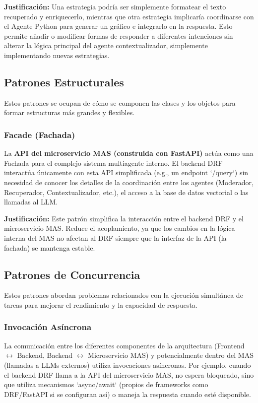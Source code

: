 \textbf{Justificación:} Una estrategia podría ser simplemente formatear el texto recuperado y enriquecerlo, mientras que otra estrategia implicaría coordinarse con el Agente Python para generar un gráfico e integrarlo en la respuesta. Esto permite añadir o modificar formas de responder a diferentes intenciones sin alterar la lógica principal del agente contextualizador, simplemente implementando nuevas estrategias.

\subsection{Patrones Estructurales}
\label{subsec:patrones_estructurales}
Estos patrones se ocupan de cómo se componen las clases y los objetos para formar estructuras más grandes y flexibles.

\subsubsection{Facade (Fachada)}
La \textbf{API del microservicio MAS (construida con FastAPI)} actúa como una Fachada para el complejo sistema multiagente interno. El backend DRF interactúa únicamente con esta API simplificada (e.g., un endpoint `/query`) sin necesidad de conocer los detalles de la coordinación entre los agentes (Moderador, Recuperador, Contextualizador, etc.), el acceso a la base de datos vectorial o las llamadas al LLM.

\textbf{Justificación:} Este patrón simplifica la interacción entre el backend DRF y el microservicio MAS. Reduce el acoplamiento, ya que los cambios en la lógica interna del MAS no afectan al DRF siempre que la interfaz de la API (la fachada) se mantenga estable.

\subsection{Patrones de Concurrencia}
\label{subsec:patrones_concurrencia}
Estos patrones abordan problemas relacionados con la ejecución simultánea de tareas para mejorar el rendimiento y la capacidad de respuesta.

\subsubsection{Invocación Asíncrona}
La comunicación entre los diferentes componentes de la arquitectura (Frontend $\leftrightarrow$ Backend, Backend $\leftrightarrow$ Microservicio MAS) y potencialmente dentro del MAS (llamadas a LLMs externos) utiliza invocaciones asíncronas. Por ejemplo, cuando el backend DRF llama a la API del microservicio MAS, no espera bloqueado, sino que utiliza mecanismos `async/await` (propios de frameworks como DRF/FastAPI si se configuran así) o maneja la respuesta cuando esté disponible.

